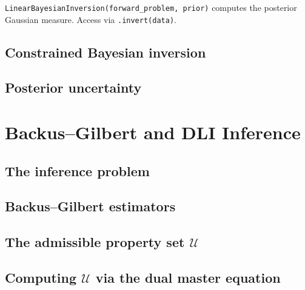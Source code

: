 \documentclass[11pt,twoside,openright]{book}
\theoremstyle{plain}
\theoremstyle{definition}
\theoremstyle{remark}
\begin{document}
\begin{codebox}
\texttt{LinearBayesianInversion(forward\_problem, prior)} computes the
posterior Gaussian measure. Access via \texttt{.invert(data)}.
\end{codebox}

\section{Constrained Bayesian inversion}
\label{sec:constrained-bayesian}

\section{Posterior uncertainty}
\label{sec:posterior-uncertainty}


\chapter{Backus--Gilbert and DLI Inference}
\label{ch:backus-gilbert}

\section{The inference problem}
\label{sec:inference-problem}

\section{Backus--Gilbert estimators}
\label{sec:bg-estimators}

\section{The admissible property set $\mathcal{U}$}
\label{sec:admissible-set}

\section{Computing $\mathcal{U}$ via the dual master equation}
\label{sec:computing-U}
\end{document}
